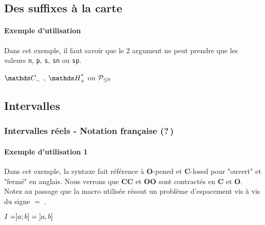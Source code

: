 \documentclass[12pt,a4paper]{article}
\theoremstyle{definition}
\begin{document}




\subsection{Des suffixes à la carte}

\paragraph{Exemple d'utilisation}

Dans cet exemple, il faut savoir que le 2\ieme{} argument ne peut prendre que les valeurs \verb+n+, \verb+p+, \verb+s+, \verb+sn+ ou \verb+sp+.

\begin{latexex}
$\setspecial{\CC}{n}$ ,
$\setspecial{\HH}{sp}$ ou
$\setspecial*{\setproba{P}}{n}$
\end{latexex}



\subsection{Intervalles}

\subsubsection{Intervalles réels - Notation française (?\,)}

\paragraph{Exemple d'utilisation 1}

Dans cet exemple, la syntaxe fait référence à \textbf{O}-pened et \textbf{C}-losed pour "ouvert" et "fermé" en anglais.
Nous verrons que \textbf{CC} et \textbf{OO} sont contractés en \textbf{C} et \textbf{O}.
Notez au passage que la macro utilisée résout un problème d'espacement vis à vis du signe $=$ .

\begin{latexex}
$I = ]a ; b] = \intervalOC{a}{b}$
\end{latexex}


\end{document}
